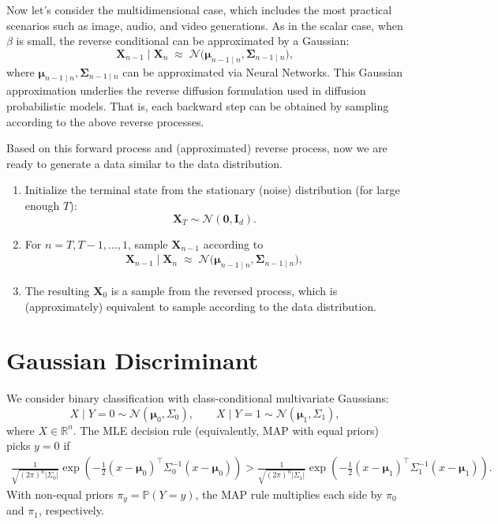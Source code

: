 \documentclass{article}
\begin{document}
Now let's consider the multidimensional case, which includes the most practical scenarios such as image, audio, and video generations.
As in the scalar case, when $\beta$ is small, the reverse conditional can be approximated by a Gaussian:
\[
\mathbf{X}_{n-1} \mid \mathbf{X}_n 
\;\approx\;
\mathcal{N}\!\big(
\boldsymbol{\mu}_{n-1\mid n},
\boldsymbol{\Sigma}_{n-1\mid n}
\big),
\]
where $\boldsymbol{\mu}_{n-1\mid n},  \boldsymbol{\Sigma}_{n-1\mid n}$ can be approximated via Neural Networks.
This Gaussian approximation underlies the reverse diffusion formulation used in diffusion probabilistic models.
That is, each backward step can be obtained by sampling according to the above reverse processes.

Based on this forward process and (approximated) reverse process, now we are ready to generate a data similar to the data distribution.
\begin{enumerate}
    \item[\textbf{1.}] 
    Initialize the terminal state from the stationary (noise) distribution (for large enough $T$):
    \[
        \mathbf{X}_T \sim \mathcal{N}(\mathbf{0}, \mathbf{I}_d).
    \]

    \item[\textbf{2.}]
    For $n = T, T-1, \dots, 1$, sample $\mathbf{X}_{n-1}$ according to
    \begin{align*}
\mathbf{X}_{n-1} \mid \mathbf{X}_n  \;\approx\; \mathcal{N}\!\big( \boldsymbol{\mu}_{n-1\mid n}, \boldsymbol{\Sigma}_{n-1\mid n} \big),
    \end{align*}
    \item[\textbf{3.}]
    The resulting $\mathbf{X}_0$ is a sample from the reversed process,
    which is (approximately) equivalent to sample according to the data distribution.
\end{enumerate}



\section{Gaussian Discriminant}

We consider binary classification with class-conditional multivariate Gaussians:
\[
X \mid Y=0 \sim \mathcal{N}(\boldsymbol{\mu}_0,\Sigma_0),
\qquad
X \mid Y=1 \sim \mathcal{N}(\boldsymbol{\mu}_1,\Sigma_1),
\]
where $X\in\mathbb{R}^n$. The MLE decision rule (equivalently, MAP with equal priors) picks $y=0$ if
\begin{align}
\frac{1}{\sqrt{(2\pi)^n |\Sigma_0|}}
\exp\!\left(
-\tfrac{1}{2}(x-\boldsymbol{\mu}_0)^\top \Sigma_0^{-1} (x-\boldsymbol{\mu}_0)
\right)
>
\frac{1}{\sqrt{(2\pi)^n |\Sigma_1|}}
\exp\!\left(
-\tfrac{1}{2}(x-\boldsymbol{\mu}_1)^\top \Sigma_1^{-1} (x-\boldsymbol{\mu}_1)
\right).
\end{align}
With non-equal priors $\pi_y = \mathbb{P}(Y=y)$, the MAP rule multiplies each side by $\pi_0$ and $\pi_1$, respectively.
\end{document}
